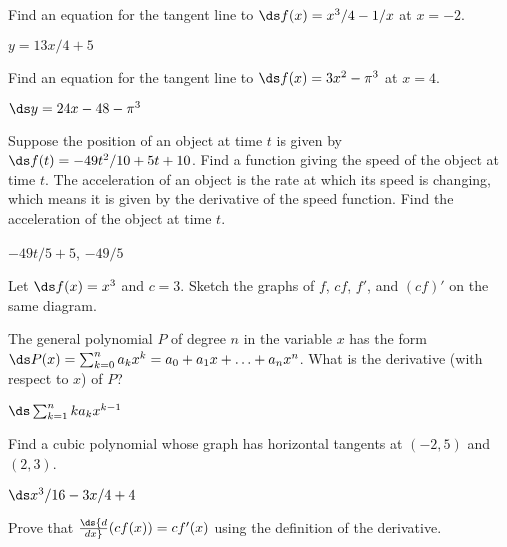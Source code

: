 \begin{enumialphparenastyle}
\begin{ex} 
 Find an equation for the tangent line to $\ds f(x) = x^3/4 - 1/x$ at $x=-2$.
\begin{sol}
$y=13x/4+5$
\end{sol}
\end{ex}

\begin{ex} 
Find an equation for 
the tangent line to $\ds f(x)= 3x^2 - \pi ^3$ at $x= 4$.
\begin{sol}
$\ds y=24x-48-\pi^3$
\end{sol}
\end{ex}

\begin{ex} 
Suppose the position of an object at time $t$ is  given by
$\ds f(t)=-49 t^2/10+5t+10$. Find a function giving the speed of the object
at time $t$. The acceleration of an object is the rate at which its
speed is changing, which means it is given by the derivative of the
speed function. Find the acceleration of the object at time $t$.
\begin{sol}
$-49t/5+5$, $-49/5$
\end{sol}
\end{ex}

\begin{ex} 
Let $\ds f(x) =x^3$ and $c= 3$. Sketch the graphs of $f$,
$cf$, $f'$, and $(cf)'$ on the same diagram.
\end{ex}

\begin{ex} 
The general polynomial $P$ of degree $n$ in the variable $x$
has the form $\ds P(x)= \sum _{k=0 } ^n a_k x^k = a_0 + a_1 x + \ldots
+ a_n x^n$. What is the derivative (with respect to $x$)
of $P$?
\begin{sol}
$\ds\sum_{k=1}^n ka_kx^{k-1}$
\end{sol}
\end{ex}

\begin{ex} 
Find a cubic polynomial whose graph has horizontal tangents at
$(-2 , 5)$ and $(2, 3)$.
\begin{sol}
$\ds x^3/16-3x/4+4$
\end{sol}
\end{ex}
 
\begin{ex} 
Prove that $\ds{d\over dx}(cf(x))= cf'(x)$ using the
definition of the derivative.
\end{ex}


\end{enumialphparenastyle}
